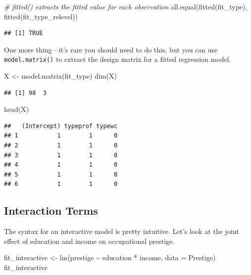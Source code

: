 \documentclass[
  12pt,
  oneside,openany]{book}
\newenvironment{Shaded}{\begin{snugshade}}{\end{snugshade}}
\newcommand{\AttributeTok}[1]{\textcolor[rgb]{0.77,0.63,0.00}{#1}}
\newcommand{\CommentTok}[1]{\textcolor[rgb]{0.56,0.35,0.01}{\textit{#1}}}
\newcommand{\FunctionTok}[1]{\textcolor[rgb]{0.00,0.00,0.00}{#1}}
\newcommand{\NormalTok}[1]{#1}
\newcommand{\OtherTok}[1]{\textcolor[rgb]{0.56,0.35,0.01}{#1}}
\newcommand{\SpecialCharTok}[1]{\textcolor[rgb]{0.00,0.00,0.00}{#1}}
\begin{document}
\begin{Shaded}
\begin{Highlighting}[]
\CommentTok{\# fitted() extracts the fitted value for each observation}
\FunctionTok{all.equal}\NormalTok{(}\FunctionTok{fitted}\NormalTok{(fit\_type), }\FunctionTok{fitted}\NormalTok{(fit\_type\_relevel))}
\end{Highlighting}
\end{Shaded}

\begin{verbatim}
## [1] TRUE
\end{verbatim}

One more thing---it's rare you should need to do this, but you can use \texttt{model.matrix()} to extract the design matrix for a fitted regression model.

\begin{Shaded}
\begin{Highlighting}[]
\NormalTok{X }\OtherTok{\textless{}{-}} \FunctionTok{model.matrix}\NormalTok{(fit\_type)}
\FunctionTok{dim}\NormalTok{(X)}
\end{Highlighting}
\end{Shaded}

\begin{verbatim}
## [1] 98  3
\end{verbatim}

\begin{Shaded}
\begin{Highlighting}[]
\FunctionTok{head}\NormalTok{(X)}
\end{Highlighting}
\end{Shaded}

\begin{verbatim}
##   (Intercept) typeprof typewc
## 1           1        1      0
## 2           1        1      0
## 3           1        1      0
## 4           1        1      0
## 5           1        1      0
## 6           1        1      0
\end{verbatim}

\hypertarget{interaction-terms-1}{%
\subsection{Interaction Terms}\label{interaction-terms-1}}

The syntax for an interactive model is pretty intuitive. Let's look at the joint effect of education and income on occupational prestige.

\begin{Shaded}
\begin{Highlighting}[]
\NormalTok{fit\_interactive }\OtherTok{\textless{}{-}} \FunctionTok{lm}\NormalTok{(prestige }\SpecialCharTok{\textasciitilde{}}\NormalTok{ education }\SpecialCharTok{*}\NormalTok{ income, }\AttributeTok{data =}\NormalTok{ Prestige)}
\NormalTok{fit\_interactive}
\end{Highlighting}
\end{Shaded}
\end{document}
